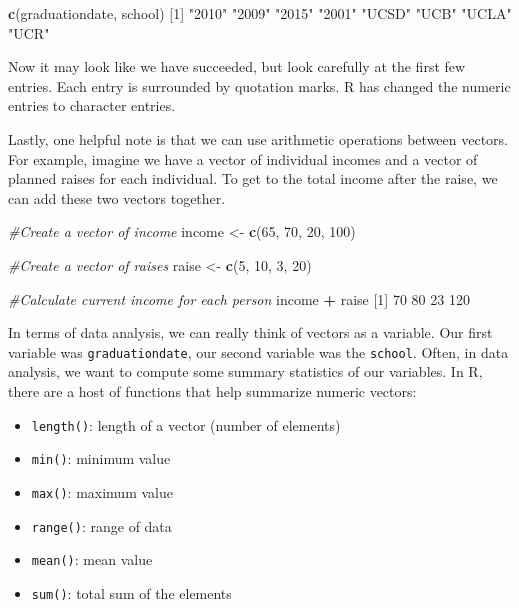 \documentclass[
]{book}
\newenvironment{Shaded}{\begin{snugshade}}{\end{snugshade}}
\newcommand{\CommentTok}[1]{\textcolor[rgb]{0.56,0.35,0.01}{\textit{#1}}}
\newcommand{\DecValTok}[1]{\textcolor[rgb]{0.00,0.00,0.81}{#1}}
\newcommand{\FunctionTok}[1]{\textcolor[rgb]{0.13,0.29,0.53}{\textbf{#1}}}
\newcommand{\NormalTok}[1]{#1}
\newcommand{\OtherTok}[1]{\textcolor[rgb]{0.56,0.35,0.01}{#1}}
\newcommand{\SpecialCharTok}[1]{\textcolor[rgb]{0.81,0.36,0.00}{\textbf{#1}}}
\newcommand{\StringTok}[1]{\textcolor[rgb]{0.31,0.60,0.02}{#1}}
\providecommand{\tightlist}{%
  \setlength{\itemsep}{0pt}\setlength{\parskip}{0pt}}
\begin{document}
\begin{Shaded}
\begin{Highlighting}[]
\FunctionTok{c}\NormalTok{(graduationdate, school)}
\NormalTok{[}\DecValTok{1}\NormalTok{] }\StringTok{"2010"} \StringTok{"2009"} \StringTok{"2015"} \StringTok{"2001"} \StringTok{"UCSD"} \StringTok{"UCB"}  \StringTok{"UCLA"} \StringTok{"UCR"} 
\end{Highlighting}
\end{Shaded}

Now it may look like we have succeeded, but look carefully at the first few entries. Each entry is surrounded by quotation marks. R has changed the numeric entries to character entries.

Lastly, one helpful note is that we can use arithmetic operations between vectors. For example, imagine we have a vector of individual incomes and a vector of planned raises for each individual. To get to the total income after the raise, we can add these two vectors together.

\begin{Shaded}
\begin{Highlighting}[]
\CommentTok{\#Create a vector of income}
\NormalTok{income }\OtherTok{\textless{}{-}} \FunctionTok{c}\NormalTok{(}\DecValTok{65}\NormalTok{, }\DecValTok{70}\NormalTok{, }\DecValTok{20}\NormalTok{, }\DecValTok{100}\NormalTok{)}

\CommentTok{\#Create a vector of raises}
\NormalTok{raise }\OtherTok{\textless{}{-}} \FunctionTok{c}\NormalTok{(}\DecValTok{5}\NormalTok{, }\DecValTok{10}\NormalTok{, }\DecValTok{3}\NormalTok{, }\DecValTok{20}\NormalTok{)}

\CommentTok{\#Calculate current income for each person}
\NormalTok{income }\SpecialCharTok{+}\NormalTok{ raise}
\NormalTok{[}\DecValTok{1}\NormalTok{]  }\DecValTok{70}  \DecValTok{80}  \DecValTok{23} \DecValTok{120}
\end{Highlighting}
\end{Shaded}

In terms of data analysis, we can really think of vectors as a variable. Our first variable was \texttt{graduationdate}, our second variable was the \texttt{school}. Often, in data analysis, we want to compute some summary statistics of our variables. In R, there are a host of functions that help summarize numeric vectors:

\begin{itemize}
\tightlist
\item
  \texttt{length()}: length of a vector (number of elements)
\item
  \texttt{min()}: minimum value
\item
  \texttt{max()}: maximum value
\item
  \texttt{range()}: range of data
\item
  \texttt{mean()}: mean value
\item
  \texttt{sum()}: total sum of the elements
\end{itemize}
\end{document}
